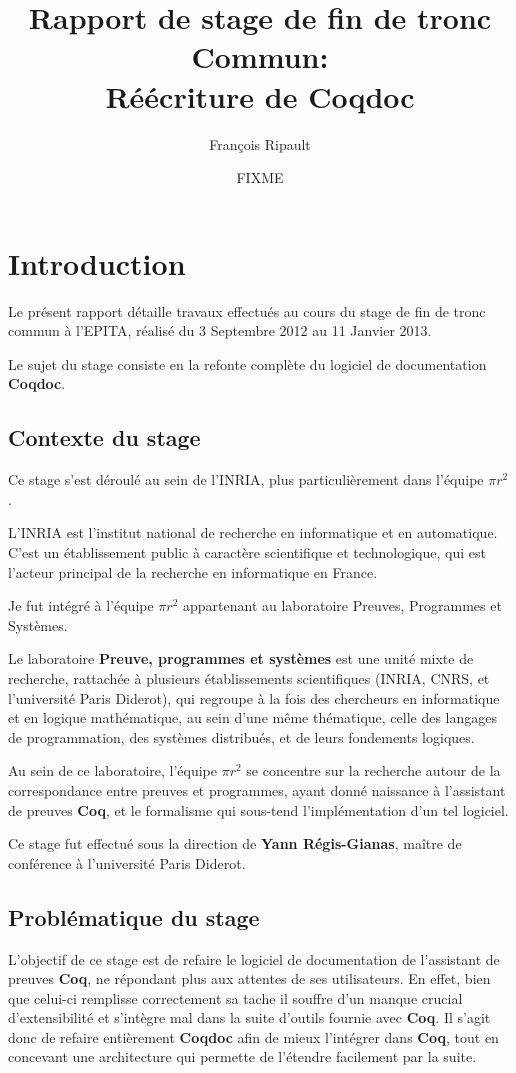 \documentclass[a4paper, 11pt]{report}
\title{Rapport de stage de fin de tronc Commun: \\
  Réécriture de Coqdoc}
\author{François Ripault}
\date{FIXME}
\newcommand{\pir}[0]{\textbf{$\pi r^2$}\xspace}
\newcommand{\coq}[0]{\textbf{Coq}\xspace}
\newcommand{\coqdoc}[0]{\textbf{Coqdoc}\xspace}
\newcommand{\yrg}[0]{\xspace\textbf{Yann Régis-Gianas}\xspace}
\newcommand{\epita}[0]{EPITA}
\begin{document}
\maketitle
\thispagestyle{empty}

\tableofcontents
\thispagestyle{empty}

\setcounter{page}{0}
\chapter{Introduction}
  Le présent rapport détaille travaux effectués au cours du stage de fin
  de tronc commun à l'\epita, réalisé du 3 Septembre 2012 au 11 Janvier 2013.

  Le sujet du stage consiste en la refonte complète du logiciel de
  documentation \coqdoc.

  \section{Contexte du stage}
  Ce stage s'est déroulé au sein de l'INRIA, plus particulièrement dans
  l'équipe \pir.

  L'INRIA est l'institut national de recherche en informatique et en
  automatique. C'est un établissement public à caractère scientifique et
  technologique, qui est l'acteur principal de la recherche en informatique en
  France.

  Je fut intégré à l'équipe \pir appartenant au laboratoire Preuves, Programmes et
  Systèmes.

  Le laboratoire \textbf{Preuve, programmes et systèmes} est une unité mixte
  de recherche, rattachée à plusieurs établissements scientifiques (INRIA,
  CNRS, et l'université Paris Diderot), qui regroupe à la fois des
  chercheurs en informatique et en logique mathématique, au sein d'une même
  thématique, celle des langages de programmation, des systèmes distribués,
  et de leurs fondements logiques.

  Au sein de ce laboratoire, l'équipe \pir se concentre sur la recherche
  autour de la correspondance entre preuves et programmes, ayant donné
  naissance à l'assistant de preuves \coq, et le formalisme qui sous-tend
  l'implémentation d'un tel logiciel.

  Ce stage fut effectué sous la direction de \yrg, maître de conférence à
  l'université Paris Diderot.

  \section{Problématique du stage}
  L'objectif de ce stage est de refaire le logiciel de documentation de
  l'assistant de preuves \coq, ne répondant plus aux attentes de ses
  utilisateurs.
  En effet, bien que celui-ci remplisse correctement sa tache il souffre d'un
  manque crucial d'extensibilité et s'intègre mal dans la suite d'outils
  fournie avec \coq. Il s'agit donc de refaire entièrement \coqdoc{} afin de
  mieux l'intégrer dans \coq, tout en concevant une architecture qui permette
  de l'étendre facilement par la suite.
\end{document}
